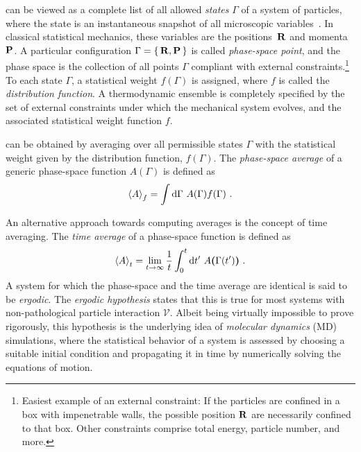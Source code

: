  can be viewed as a complete list of all allowed \emph{states} $\Gamma$ of a system of particles, where the state is an instantaneous snapshot of all microscopic variables~\cite{Phillies2012}. In classical statistical mechanics, these variables are the positions~${\bf R}$ and momenta~${\bf P}$. A particular configuration $\Gamma = \set{{\bf R}, {\bf P}}$ is called \emph{phase-space point}, and the phase space is the collection of all points $\Gamma$ compliant with external constraints.\footnote{Easiest example of an external constraint: If the particles are confined in a box with impenetrable walls, the possible position ${\bf R}$ are necessarily confined to that box. Other constraints comprise total energy, particle number, and more.} To each state $\Gamma$, a statistical weight $f (\Gamma)$ is assigned, where $f$ is called the \emph{distribution function}. A thermodynamic ensemble is completely specified by the set of external constraints under which the mechanical system evolves, and the associated statistical weight function $f$.

 can be obtained by averaging over all permissible states $\Gamma$ with the statistical weight given by the distribution function, $f (\Gamma)$. The \emph{phase-space average} of a generic phase-space function $A (\Gamma)$ is defined as
\begin{align}
  \braket{A}_f 
    = \int \d \Gamma ~ A(\Gamma) f (\Gamma)~.
  \label{eq:phase.space.average}
\end{align}

An alternative approach towards computing averages is the concept of time averaging. The \emph{time average} of a phase-space function is defined as
\begin{align}
  \braket{A}_t
    = \lim\limits_{t \to \infty} \frac{1}{t} \int_0^t \d t' ~ A {\bm (} \Gamma(t') {\bm )}~.
  \label{eq:time.average}
\end{align}
A system for which the phase-space and the time average are identical is said to be \emph{ergodic}. The \emph{ergodic hypothesis} states that this is true for most systems with non-pathological particle interaction $\mathcal V$. Albeit being virtually impossible to prove rigorously, this hypothesis is the underlying idea of \emph{molecular dynamics} (MD) simulations, where the statistical behavior of a system is assessed by choosing a suitable initial condition and propagating it in time by numerically solving the equations of motion.

